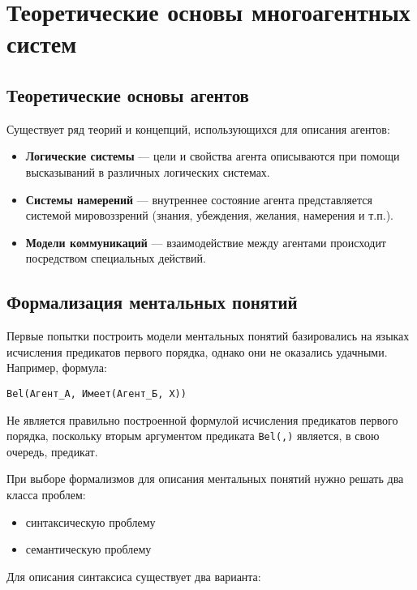 \section{Теоретические основы многоагентных систем}

\subsection{Теоретические основы агентов}

Существует ряд теорий и концепций, использующихся для описания агентов:

\begin{itemize}
  \item \textbf{Логические системы} — цели и свойства агента описываются при помощи высказываний в различных логических системах.
  \item \textbf{Системы намерений} — внутреннее состояние агента представляется системой мировоззрений (знания, убеждения, желания, намерения и т.п.).
  \item \textbf{Модели коммуникаций} — взаимодействие между агентами происходит посредством специальных действий.
\end{itemize}

\subsection{Формализация ментальных понятий}

Первые попытки построить модели ментальных понятий базировались на языках исчисления предикатов первого порядка, однако они не оказались удачными. Например, формула:

\begin{verbatim}
Bel(Агент_А, Имеет(Агент_Б, X))
\end{verbatim}

Не является правильно построенной формулой исчисления предикатов первого порядка, поскольку вторым аргументом предиката \texttt{Bel(,)} является, в свою очередь, предикат.

При выборе формализмов для описания ментальных понятий нужно решать два класса проблем:

\begin{itemize}
  \item синтаксическую проблему
  \item семантическую проблему
\end{itemize}

Для описания синтаксиса существует два варианта:

